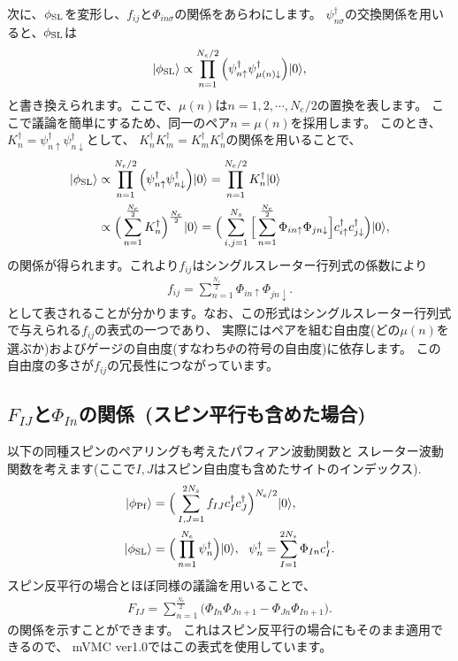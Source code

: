 次に、$\phi_{\rm SL}$を変形し、$f_{ij}$と$\Phi_{in\sigma}$の関係をあらわにします。
$\psi^{\dagger}_{n\sigma}$の交換関係を用いると、$\phi_{\rm SL}$は
\begin{align}
|\phi_{\rm SL}\rangle \propto \prod_{n=1}^{N_{e}/2}\Big(\psi_{n\uparrow}^{\dagger}\psi_{\mu(n)\downarrow}^{\dagger}\Big)|0\rangle,
\end{align}
と書き換えられます。ここで、$\mu(n)$は$n= 1, 2, \cdots, N_{e}/2$の置換を表します。
ここで議論を簡単にするため、同一のペア$n=\mu(n)$を採用します。
このとき、$K_{n}^{\dagger}=\psi_{n\uparrow}^{\dagger}\psi_{n\downarrow}^{\dagger}$として、
$K_{n}^{\dagger}K_{m}^{\dagger}=K_{m}^{\dagger}K_{n}^{\dagger}$の関係を用いることで、
\begin{align}
|\phi_{\rm SL}\rangle &\propto \prod_{n=1}^{N_{e}/2}\Big(\psi_{n\uparrow}^{\dagger}\psi_{n\downarrow}^{\dagger}\Big)|0\rangle
=\prod_{n=1}^{N_{e}/2} K_{n}^{\dagger}|0\rangle \\
&\propto\Big(\sum_{n=1}^{\frac{N_{e}}{2}}K_{n}^{\dagger}\Big)^{\frac{N_{e}}{2}} |0\rangle
=\Big(\sum_{i,j=1}^{N_{s}}\Big[\sum_{n=1}^{\frac{N_{e}}{2}}\Phi_{in\uparrow}\Phi_{jn\downarrow}\Big]
c_{i\uparrow}^{\dagger}c_{j\downarrow}^{\dagger}\Big)|0\rangle,
\end{align}
の関係が得られます。これより$f_{ij}$はシングルスレーター行列式の係数により
\begin{align}
f_{ij}=\sum_{n=1}^{\frac{N_{e}}{2}}\Phi_{in\uparrow}\Phi_{jn\downarrow}.
\end{align}
として表されることが分かります。なお、この形式はシングルスレーター行列式で与えられる$f_{ij}$の表式の一つであり、
実際にはペアを組む自由度(どの$\mu(n)$を選ぶか)およびゲージの自由度(すなわち$\Phi$の符号の自由度)に依存します。
この自由度の多さが$f_{ij}$の冗長性につながっています。

\subsection{$F_{IJ}$と$\Phi_{In}$の関係~(スピン平行も含めた場合)}
以下の同種スピンのペアリングも考えたパフィアン波動関数と
スレーター波動関数を考えます(ここで$I,J$はスピン自由度も含めたサイトのインデックス).
\begin{align}
|\phi_{\rm Pf}\rangle&=\Big(\sum_{I,J=1}^{2N_{s}}f_{IJ}c_{I}^{\dagger}c_{J}^{\dagger}\Big)^{N_{\rm e}/2}|0\rangle, \\
|\phi_{\rm SL}\rangle&=\Big(\prod_{n=1}^{N_{e}}\psi_{n}^{\dagger}\Big)|0\rangle,~~\psi_{n}^{\dagger}=\sum_{I=1}^{2N_{s}}\Phi_{In}c^{\dagger}_{I}.
\end{align}
スピン反平行の場合とほぼ同様の議論を用いることで、
\begin{align}
F_{IJ}=\sum_{n=1}^{\frac{N_{e}}{2}}\Big(\Phi_{In}\Phi_{Jn+1}-\Phi_{Jn}\Phi_{In+1}\Big).
\end{align}
の関係を示すことができます。
これはスピン反平行の場合にもそのまま適用できるので、
mVMC ver1.0ではこの表式を使用しています。

